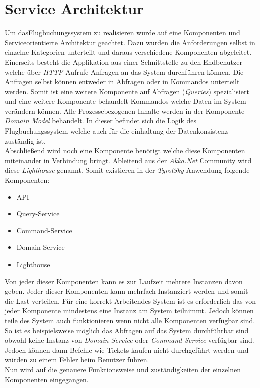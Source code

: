 \section{Service Architektur}
Um dasFlugbuchungssystem zu realisieren wurde auf eine Komponenten und Serviceorientierte Architektur geachtet. Dazu wurden die Anforderungen selbst in einzelne Kategorien unterteilt und daraus verschiedene Komponenten abgeleitet. \\
Einerseits besteht die Applikation aus einer Schnittstelle zu den Endbenutzer welche über \textit{HTTP} Aufrufe Anfragen an das System durchführen können. Die Anfragen selbst können entweder in Abfragen oder in Kommandos unterteilt werden. Somit ist eine weitere Komponente auf Abfragen (\textit{Queries}) spezialisiert und eine weitere Komponente behandelt Kommandos welche Daten im System verändern können. Alle Prozessebezogenen Inhalte werden in der Komponente \textit{Domain Model} behandelt. In dieser befindet sich die Logik des Flugbuchungssystem welche auch für die einhaltung der Datenkonsistenz zuständig ist. \\
Abschließend wird noch eine Komponente benötigt welche diese Komponenten miteinander in Verbindung bringt. Ableitend aus der \textit{Akka.Net} Community wird diese \textit{Lighthouse} genannt. Somit existieren in der \textit{TyrolSky} Anwendung folgende Komponenten:
\begin{itemize}
    \item API
    \item Query-Service
    \item Command-Service
    \item Domain-Service
    \item Lighthouse
\end{itemize}
Von jeder dieser Komponenten kann es zur Laufzeit mehrere Instanzen davon geben. 
Jeder dieser Komponenten kann mehrfach Instanziert werden und somit die Last verteilen. Für eine korrekt Arbeitendes System ist es erforderlich das von jeder Komponente mindestens eine Instanz am System teilnimmt. Jedoch können teile des System auch funktionieren wenn nicht alle Komponenten verfügbar sind. So ist es beispielsweise möglich das Abfragen auf das System durchführbar sind obwohl keine Instanz von \textit{Domain Service} oder \textit{Command-Service} verfügbar sind. Jedoch können dann Befehle wie Tickets kaufen nicht durchgeführt werden und würden zu einem Fehler beim Benutzer führen. \\
Nun wird auf die genauere Funktionsweise und zuständigkeiten der einzelnen Komponenten eingegangen.

